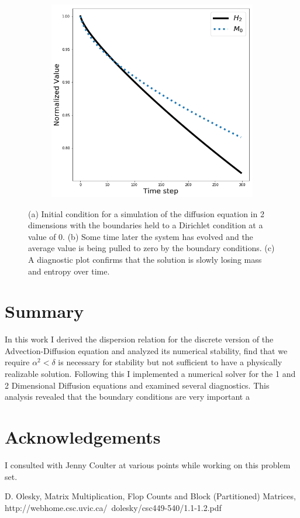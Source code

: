 \documentclass[]{article}
\begin{document}
\begin{figure}
\begin{subfigure}{.5\textwidth}
		\caption{}
	\end{subfigure}
	\begin{subfigure}{.5\textwidth}
		\centering
		\includegraphics[width=.8\linewidth]{figures/2D_Diffusion_DirBound0.png}
		\caption{}
	\end{subfigure}
	\caption{(a) Initial condition for a simulation of the diffusion equation in 2 dimensions with the boundaries held to a Dirichlet condition at a value of 0. (b) Some time later the system has evolved and the average value is being pulled to zero by the boundary conditions. (c) A diagnostic plot confirms that the solution is slowly losing mass and entropy over time.}
	\label{fig:2D}
\end{figure}
 

\section{Summary}
In this work I derived the dispersion relation for the discrete version of the Advection-Diffusion equation and analyzed its numerical stability, find that we require $\alpha^2 < \delta$ is necessary for stability but not sufficient to have a physically realizable solution. Following this I implemented a numerical solver for the 1 and 2 Dimensional Diffusion equations and examined several diagnostics. This analysis revealed that the boundary conditions are very important 
 a
\section{Acknowledgements}
I consulted with Jenny Coulter at various points while working on this problem set.

  \begin{thebibliography}{1}
  	
  	 D. Olesky, Matrix Multiplication, Flop Counts and Block (Partitioned) Matrices, http://webhome.csc.uvic.ca/~dolesky/csc449-540/1.1-1.2.pdf

  \end{thebibliography}
\end{document}
